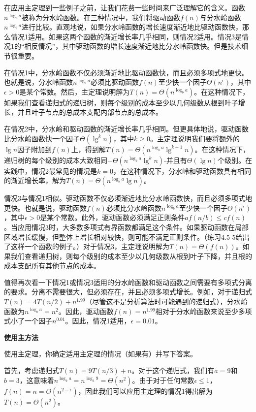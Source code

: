 \documentclass[lang=cn,newtx,10pt,scheme=chinese]{elegantbook}
\begin{document}
在应用主定理到一些例子之前，让我们花费一些时间来广泛理解它的含义。函数$n^{\log _b a}$被称为分水岭函数。在三种情况中，我们将驱动函数$f(n)$与分水岭函数$n^{\log _b a}$进行比较。直观地说，如果分水岭函数的增长速度渐近地比驱动函数快，那么情况1适用。如果这两个函数的渐近增长率几乎相同，则情况2适用。情况3是情况1的“相反情况”，其中驱动函数的增长速度渐近地比分水岭函数快。但是技术细节很重要。

在情况1中，分水岭函数不仅必须渐近地比驱动函数快，而且必须多项式地更快。也就是说，分水岭函数$n^{\log _b a}$必须比驱动函数$f(n)$至少快一个因子$\Theta\left(n^\epsilon\right)$，其中$\epsilon>0$是某个常数。然后，主定理说明解为$T(n)=\Theta\left(n^{\log _b a}\right)$。在这种情况下，如果我们查看递归式的递归树，则每个级别的成本至少以几何级数从根到叶子增长，并且叶子节点的总成本支配内部节点的总成本。

在情况2中，分水岭和驱动函数的渐近增长率几乎相同。但更具体地说，驱动函数比分水岭函数快一个因子$\Theta\left(\lg ^k n\right)$，其中$k \geq 0$。主定理说明我们要将额外的$\lg n$因子附加到$f(n)$上，得到解$T(n)=\Theta\left(n^{\log _b a} \lg ^{k+1} n\right)$。在这种情况下，递归树的每个级别的成本大致相同$-\Theta\left(n^{\log _b a} \lg ^k n\right)$-并且有$\Theta(\lg n)$个级别。在实践中，情况2最常见的情况是$k=0$，在这种情况下，分水岭和驱动函数具有相同的渐近增长率，解为$T(n)=\Theta\left(n^{\log _b a} \lg n\right)$。

情况3与情况1相似。驱动函数不仅必须渐近地比分水岭函数快，而且必须多项式地更快。也就是说，驱动函数$f(n)$必须比分水岭函数$n^{\log _b a}$至少快一个因子$\Theta\left(n^\epsilon\right)$，其中$\epsilon>0$是某个常数。此外，驱动函数必须满足正则条件$a f(n / b) \leq c f(n)$。当应用情况3时，大多数多项式有界函数都满足这个条件。如果驱动函数在局部区域增长缓慢，但整体上增长相对较快，则可能不满足正则条件。（练习4.5-5给出了这样一个函数的例子。）对于情况3，主定理说明解为$T(n)=\Theta(f(n))$。如果我们查看递归树，则每个级别的成本至少以几何级数从根到叶子下降，并且根的成本支配所有其他节点的成本。

值得再次看一下情况1或情况3适用的分水岭函数和驱动函数之间需要有多项式分离的要求。分离不需要很大，但必须存在，并且必须多项式增长。例如，对于递归式$T(n)=4 T(n / 2)+n^{1.99}$（尽管这不是分析算法时可能遇到的递归式），分水岭函数为$n^{\log _b a}=n^2$。因此，驱动函数$f(n)=n^{1.99}$相对于分水岭函数来说至少多项式小了一个因子$n^{0.01}$。因此，情况1适用，$\epsilon=0.01$。

\textbf{使用主方法}

使用主定理，你确定适用主定理的情况（如果有）并写下答案。

首先，考虑递归式$T(n)=9 T(n / 3)+n$。对于这个递归式，我们有$a=9$和$b=3$，这意味着$n^{\log _b a}=n^{\log _3 9}=\Theta\left(n^2\right)$。由于对于任何常数$\epsilon \leq 1$，$f(n)=n=O\left(n^{2-\epsilon}\right)$，因此我们可以应用主定理的情况1得出解为$T(n)=\Theta\left(n^2\right)$。
\end{document}
